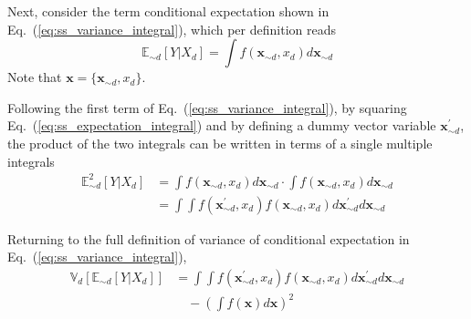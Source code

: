 Next, consider the term conditional expectation shown in Eq.~(\ref{eq:ss_variance_integral}), which per definition reads
\begin{equation}
  \mathbb{E}_{\sim d} [Y|X_d] = \int f(\mathbf{x}_{\sim d}, x_d) d\mathbf{x}_{\sim d}
\label{eq:ss_expectation_integral}
\end{equation}
Note that $\mathbf{x} = \{\mathbf{x}_{\sim d}, x_d\}$.

Following the first term of Eq.~(\ref{eq:ss_variance_integral}), by squaring Eq.~(\ref{eq:ss_expectation_integral})
and by defining a dummy vector variable $\mathbf{x}^{\prime}_{\sim d}$, 
the product of the two integrals can be written in terms of a single multiple integrals
\begin{equation}
  \begin{split}
    \mathbb{E}_{\sim d}^{2} [Y|X_d] & = \int f(\mathbf{x}_{\sim d}, x_d) d\mathbf{x}_{\sim d} \cdot \int f(\mathbf{x}_{\sim d}, x_d) d\mathbf{x}_{\sim d} \\
                                    & = \int \int f(\mathbf{x}^{\prime}_{\sim d}, x_d) f(\mathbf{x}_{\sim d}, x_d) d\mathbf{x}^{\prime}_{\sim d} d\mathbf{x}_{\sim d}
  \end{split}
\label{eq:ss_multiple_integrals}
\end{equation}

Returning to the full definition of variance of conditional expectation in Eq.~(\ref{eq:ss_variance_integral}),
\begin{equation}
  \begin{split}
    \mathbb{V}_{d}[\mathbb{E}_{\sim d}[Y|X_d]] & = \int \int f(\mathbf{x}^{\prime}_{\sim d}, x_d) f(\mathbf{x}_{\sim d}, x_d) d\mathbf{x}^{\prime}_{\sim d} d\mathbf{x}_{\sim d} \\
                                               & \quad - \left(\int f(\mathbf{x}) d\mathbf{x}\right)^2
  \end{split}
\label{eq:ss_variance_integral_single}
\end{equation}


